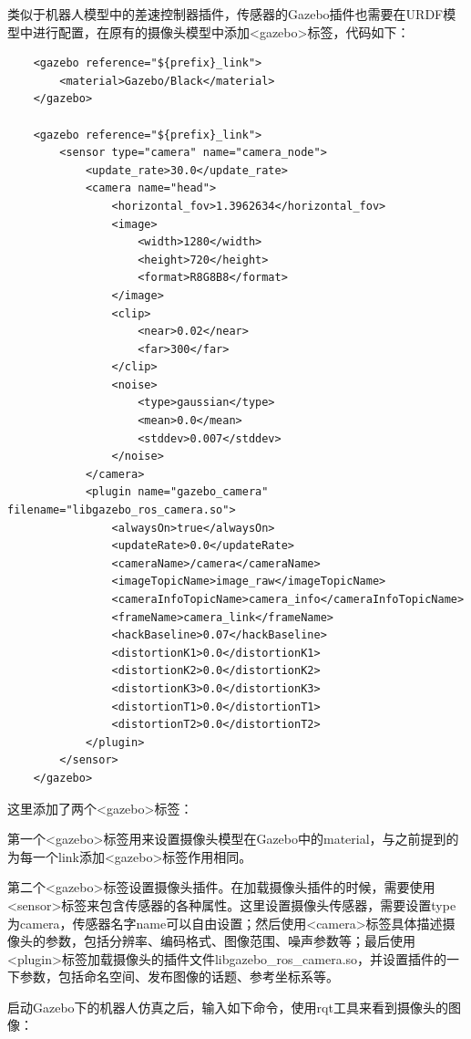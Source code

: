 \documentclass[9pt, oneside]{book}
\begin{document}
类似于机器人模型中的差速控制器插件，传感器的Gazebo插件也需要在URDF模型中进行配置，在原有的摄像头模型中添加<gazebo>标签，代码如下：

\begin{verbatim}
    <gazebo reference="${prefix}_link">
        <material>Gazebo/Black</material>
    </gazebo>

    <gazebo reference="${prefix}_link">
        <sensor type="camera" name="camera_node">
            <update_rate>30.0</update_rate>
            <camera name="head">
                <horizontal_fov>1.3962634</horizontal_fov>
                <image>
                    <width>1280</width>
                    <height>720</height>
                    <format>R8G8B8</format>
                </image>
                <clip>
                    <near>0.02</near>
                    <far>300</far>
                </clip>
                <noise>
                    <type>gaussian</type>
                    <mean>0.0</mean>
                    <stddev>0.007</stddev>
                </noise>
            </camera>
            <plugin name="gazebo_camera" filename="libgazebo_ros_camera.so">
                <alwaysOn>true</alwaysOn>
                <updateRate>0.0</updateRate>
                <cameraName>/camera</cameraName>
                <imageTopicName>image_raw</imageTopicName>
                <cameraInfoTopicName>camera_info</cameraInfoTopicName>
                <frameName>camera_link</frameName>
                <hackBaseline>0.07</hackBaseline>
                <distortionK1>0.0</distortionK1>
                <distortionK2>0.0</distortionK2>
                <distortionK3>0.0</distortionK3>
                <distortionT1>0.0</distortionT1>
                <distortionT2>0.0</distortionT2>
            </plugin>
        </sensor>
    </gazebo>
\end{verbatim}

这里添加了两个<gazebo>标签：

第一个<gazebo>标签用来设置摄像头模型在Gazebo中的material，与之前提到的为每一个link添加<gazebo>标签作用相同。

第二个<gazebo>标签设置摄像头插件。在加载摄像头插件的时候，需要使用<sensor>标签来包含传感器的各种属性。这里设置摄像头传感器，需要设置type为camera，传感器名字name可以自由设置；然后使用<camera>标签具体描述摄像头的参数，包括分辨率、编码格式、图像范围、噪声参数等；最后使用<plugin>标签加载摄像头的插件文件libgazebo\_ros\_camera.so，并设置插件的一下参数，包括命名空间、发布图像的话题、参考坐标系等。

启动Gazebo下的机器人仿真之后，输入如下命令，使用rqt工具来看到摄像头的图像：
\end{document}
